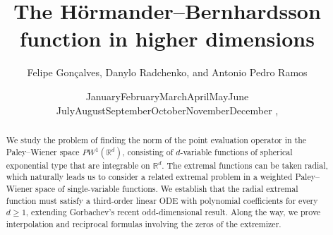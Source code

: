 \documentclass[a4paper,reqno,12pt]{amsart}
\def\today{\ifcase\month\or
  January\or February\or March\or April\or May\or June\or
  July\or August\or September\or October\or November\or December\fi
  \space\number\day, \number\year}
\renewcommand{\r}{\mathbb{R}}
\begin{document}

\title[]{The Hörmander--Bernhardsson function in higher dimensions}
\author[Gon\c{c}alves, Radchenko, Ramos]{Felipe Gon\c{c}alves, Danylo Radchenko, and Antonio Pedro Ramos}
\date{\today}
\keywords{}
\address{IMPA - Instituto de Matemática Pura e Aplicada, Rio de Janeiro, 22460-320, Brazil.}

\address{Institut des Hautes \'Etudes Scientifiques, CNRS, Laboratoire Alexander Grothendieck,
35 route de Chartres, Bures-sur-Yvette 91440, France}

\address{IMPA - Instituto de Matemática Pura e Aplicada, Rio de Janeiro, 22460-320, Brazil.}
\allowdisplaybreaks


\begin{abstract}
We study the problem of finding the norm of the point evaluation operator in the Paley--Wiener space $PW^{1}(\r^d)$, consisting of $d$-variable functions of spherical exponential type that are integrable on $\r^d$. The extremal functions can be taken radial, which naturally leads us to consider a related extremal problem in a weighted Paley--Wiener space of single-variable functions. We establish that the radial extremal function must satisfy a third-order linear ODE with polynomial coefficients for every $d \geq 1$, extending Gorbachev's recent odd-dimensional result. Along the way, we prove interpolation and reciprocal formulas involving the zeros of the extremizer. 
\end{abstract}


\maketitle


\end{document}

